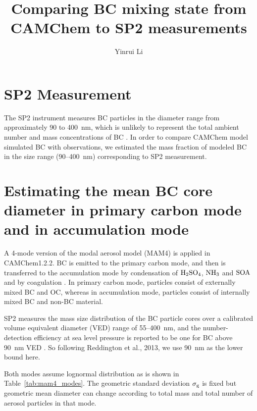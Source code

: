 \documentclass[11pt]{article}
\title{\textbf{Comparing BC mixing state from CAMChem to SP2 measurements}}
\author{Yinrui Li}
\date{}
\begin{document}
	\maketitle
	
	
	
	\section{SP2 Measurement} 
	
	The SP2 instrument measures BC particles in the diameter range from
	approximately 90 to 400~nm, which is unlikely to represent the total
	ambient number and mass concentrations of BC \citep{Reddington2013}.  In order to compare CAMChem model simulated BC with
	observations, we estimated the mass fraction of modeled BC in the size
	range (90--400~nm) corresponding to SP2 measurement.
	
	\section{Estimating the mean BC core diameter in primary carbon mode and in accumulation mode} 
	
	A 4-mode version of the modal aerosol model (MAM4) is applied in
	CAMChem1.2.2. BC is emitted to the primary carbon mode, and then is
	transferred to the accumulation mode by condensation of
	$\rm{H_2SO_4}$, $\rm{NH_3}$ and $\rm{SOA}$ and by coagulation \citep{Liu2012}. In primary carbon mode, particles consist of externally
	mixed BC and OC, whereas in accumulation mode, particles consist of
	internally mixed BC and non-BC material.
	
	SP2 measures the mass size distribution of the BC particle
	cores over a calibrated volume equivalent diameter (VED) range of
	55--400~nm, and the number-detection efficiency at sea level pressure
	is reported to be one for BC above 90~nm VED \citep{Schwarz2010a}. So following Reddington et al., 2013, we use 90~nm as the
	lower bound here.
	
	Both modes assume lognormal distribution as is shown in
	Table~\ref{tab:mam4_modes}. The geometric standard deviation $\sigma_{\rm g}$ is fixed but geometric mean diameter can
	change according to total mass and total number of aerosol particles
	in that mode.
	
\end{document}
